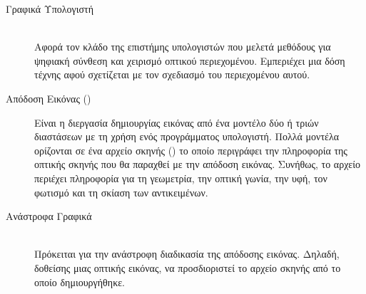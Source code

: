 \begin{description}
    \item[Γραφικά Υπολογιστή] \hfill \\ Αφορά τον κλάδο της επιστήμης υπολογιστών που μελετά μεθόδους για ψηφιακή σύνθεση και χειρισμό οπτικού περιεχομένου. Εμπεριέχει μια δόση τέχνης αφού σχετίζεται με τον σχεδιασμό του περιεχομένου αυτού.
    
    \item[Απόδοση Εικόνας ()] Είναι η διεργασία δημιουργίας εικόνας από ένα μοντέλο δύο ή τριών διαστάσεων με τη χρήση ενός προγράμματος υπολογιστή. Πολλά μοντέλα ορίζονται σε ένα αρχείο σκηνής () το οποίο περιγράφει την πληροφορία της οπτικής σκηνής που θα παραχθεί με την απόδοση εικόνας. Συνήθως, το αρχείο περιέχει πληροφορία για τη γεωμετρία, την οπτική γωνία, την υφή, τον φωτισμό και τη σκίαση των αντικειμένων.
    
    \item[Ανάστροφα Γραφικά] \hfill \\ Πρόκειται για την ανάστροφη διαδικασία της απόδοσης εικόνας. Δηλαδή, δοθείσης μιας οπτικής εικόνας, να προσδιοριστεί το αρχείο σκηνής από το οποίο δημιουργήθηκε.
    

\end{description}
